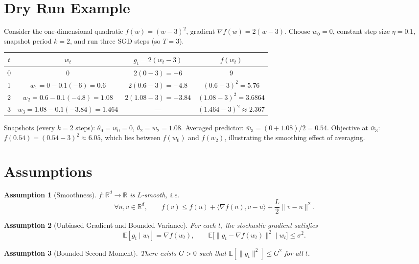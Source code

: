 \documentclass{article}
\newtheorem{assumption}{Assumption}
\newcommand{\E}{\mathbb{E}}
\begin{document}
\section*{Dry Run Example}
Consider the one‑dimensional quadratic $f(w)=(w-3)^2$, gradient $\nabla f(w)=2(w-3)$.  
Choose $w_0=0$, constant step size $\eta=0.1$, snapshot period $k=2$, and run three SGD steps (so $T=3$).  

\begin{center}
\begin{tabular}{c|c|c|c}
$t$ & $w_t$ & $g_t=2(w_t-3)$ & $f(w_t)$\\ \hline
0 & $0$ & $2(0-3)=-6$ & $9$\\
1 & $w_1=0-0.1(-6)=0.6$ & $2(0.6-3)=-4.8$ & $(0.6-3)^2=5.76$\\
2 & $w_2=0.6-0.1(-4.8)=1.08$ & $2(1.08-3)=-3.84$ & $(1.08-3)^2=3.6864$\\
3 & $w_3=1.08-0.1(-3.84)=1.464$ & — & $(1.464-3)^2\approx2.367$\\
\end{tabular}
\end{center}

Snapshots (every $k=2$ steps): $\theta_0=w_0=0$, $\theta_2=w_2=1.08$.  
Averaged predictor: $\bar w_3=(0+1.08)/2=0.54$.  
Objective at $\bar w_3$: $f(0.54)=(0.54-3)^2\approx6.05$, which lies between $f(w_0)$ and $f(w_2)$, illustrating the smoothing effect of averaging.

\newpage
\section*{Assumptions}
\begin{assumption}[Smoothness]
\label{ass:smooth}
$f:\mathbb{R}^d\to\mathbb{R}$ is $L$‑smooth, i.e.
\[
    \forall u,v\in\mathbb{R}^d,\qquad 
    f(v)\le f(u)+\langle\nabla f(u),v-u\rangle+\frac{L}{2}\|v-u\|^2 .
\]
\end{assumption}

\begin{assumption}[Unbiased Gradient and Bounded Variance]
\label{ass:unbiased}
For each $t$, the stochastic gradient satisfies
\[
    \E[g_t\mid w_t]=\nabla f(w_t),\qquad 
    \E\bigl[\|g_t-\nabla f(w_t)\|^2\mid w_t\bigr]\le\sigma^2 .
\]
\end{assumption}

\begin{assumption}[Bounded Second Moment]
\label{ass:bounded}
There exists $G>0$ such that $\E[\|g_t\|^2]\le G^2$ for all $t$.
\end{assumption}
\end{document}
